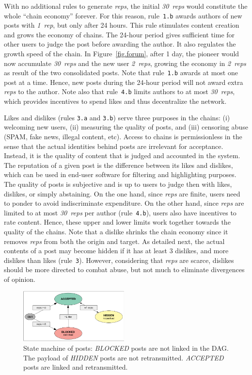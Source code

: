 \documentclass[10pt,journal,compsoc]{IEEEtran}
\newcommand{\reps}     {\emph{reps}\xspace}
\newcommand{\onerep}   {\emph{1~rep}\xspace}
\newcommand{\nreps}[1] {\emph{#1~reps\xspace}}
\begin{document}
With no additional rules to generate \reps, the initial \nreps{30} would
constitute the whole ``chain economy'' forever.
For this reason, rule~\texttt{1.b} awards authors of new posts with \onerep,
but only after 24 hours.
This rule stimulates content creation and grows the economy of chains.
The 24-hour period gives sufficient time for other users to judge the post
before awarding the author.
It also regulates the growth speed of the chain.
In Figure~\ref{fig.forum}, after 1 day, the pioneer would now accumulate
\nreps{30} and the new user \nreps{2}, growing the economy in \nreps{2} as
result of the two consolidated posts.
Note that rule~\texttt{1.b} awards at most one post at a time.
Hence, new posts during the 24-hour period will not award extra \reps to the
author.
Note also that rule~\texttt{4.b} limits authors to at most \nreps{30}, which
provides incentives to spend likes and thus decentralize the network.

Likes and dislikes (rules \texttt{3.a} and \texttt{3.b}) serve three purposes
in the chains:
    (i) welcoming new users,
    (ii) measuring the quality of posts, and
    (iii) censoring abuse (SPAM, fake news, illegal content, etc).
%
Access to chains is permissionless in the sense that the actual identities
behind posts are irrelevant for acceptance.
Instead, it is the quality of content that is judged and accounted in the
system.
%
The reputation of a given post is the difference between its likes and
dislikes, which can be used in end-user software for filtering and highlighting
purposes.
%
The quality of posts is subjective and is up to users to judge then with likes,
dislikes, or simply abstaining.
%
On the one hand, since \reps are finite, users need to ponder to avoid
indiscriminate expenditure.
On the other hand, since \reps are limited to at most \nreps{30} per author
(rule~\texttt{4.b}), users also have incentives to rate content.
Hence, these upper and lower limits work together towards the quality of the
chains.
%
Note that a dislike shrinks the chain economy since it removes \reps from both
the origin and target.
As detailed next, the actual contents of a post may become hidden if it has at
least 3 dislikes, and more dislikes than likes (rule~\texttt{3}).
However, considering that \reps are scarce, dislikes should be more directed to
combat abuse, but not much to eliminate divergences of opinion.

\begin{figure}
\centering
\includegraphics[width=0.49\textwidth]{state.png}
\caption{
    State machine of posts:
    \emph{BLOCKED} posts are not linked in the DAG.
    The payload of \emph{HIDDEN} posts are not retransmitted.
    \emph{ACCEPTED} posts are linked and retransmitted.
}
\label{fig.state}
\end{figure}
\end{document}
